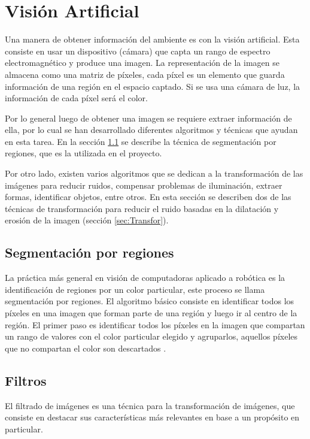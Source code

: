 \section{Visión Artificial} \label{sect:Vision_Artificial}

Una manera de obtener información del ambiente es con la visión artificial. Esta consiste en usar un dispositivo (cámara) que capta un rango de espectro electromagnético y produce una imagen. La representación de la imagen se almacena como una matriz de píxeles, cada píxel es un elemento que guarda información de una región en el espacio captado. Si se usa una cámara de luz, la información de cada píxel será el color. \cite{AiRobotics}  

Por lo general luego de obtener una imagen se requiere extraer información de ella, por lo cual se han desarrollado diferentes algoritmos y t\'ecnicas que ayudan en esta tarea. En la sección \ref{sec:Segmentacion} se describe la t\'ecnica de segmentaci\'on por regiones, que es la utilizada en el proyecto. 

Por otro lado, existen varios algoritmos que se dedican a la transformación de las imágenes para reducir
ruidos, compensar problemas de iluminación, extraer formas, identificar objetos, entre otros. En esta sección se describen dos de las técnicas de transformación para reducir el ruido basadas en la dilatación y erosión de la imagen (secci\'on \ref{sec:Transfor}). 
 
\subsection{Segmentaci\'on por regiones}\label{sec:Segmentacion}

La pr\'actica m\'as general en visi\'on de computadoras aplicado a rob\'otica es la identificaci\'on de regiones por un color particular, este proceso se llama segmentaci\'on por regiones. El algoritmo b\'asico consiste en identificar todos los p\'ixeles en una imagen que forman parte de una regi\'on y luego ir al centro de la regi\'on. El primer paso es identificar todos los p\'ixeles en la imagen que compartan un rango de valores con el color particular elegido y agruparlos, aquellos p\'ixeles que no compartan el color son descartados \cite{BookOpenCv}. 

\subsection{Filtros}
El filtrado de imágenes es una técnica para la transformación de imágenes, que consiste en destacar  sus características más relevantes en base a un propósito en particular. 

